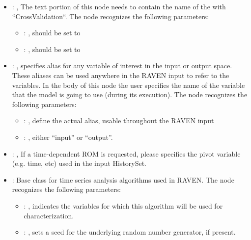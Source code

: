 \begin{itemize}
    \item {}: , 
      The text portion of this node needs to contain the name of the  with
               ``CrossValidation``.
      The  node recognizes the following parameters:
        \begin{itemize}
          \item {}: , 
            should be set to 
          \item {}: , 
            should be set to 
      \end{itemize}

    \item {}: , 
      specifies alias for         any variable of interest in the input or output space. These
      aliases can be used anywhere in the RAVEN input to         refer to the variables. In the body
      of this node the user specifies the name of the variable that the model is going to use
      (during its execution).
      The  node recognizes the following parameters:
        \begin{itemize}
          \item {}: , 
            define the actual alias, usable throughout the RAVEN input
          \item {}: , 
            either ``input'' or ``output''.
      \end{itemize}

    \item {}: , 
      If a time-dependent ROM is requested, please specifies the pivot         variable (e.g. time,
      etc) used in the input HistorySet.

    \item {}:
      Base class for time series analysis algorithms used in RAVEN.
      The  node recognizes the following parameters:
        \begin{itemize}
          \item {}: , 
            indicates the variables for which this algorithm will be used for characterization.
          \item {}: , 
            sets a seed for the underlying random number generator, if present.
      \end{itemize}


\end{itemize}
